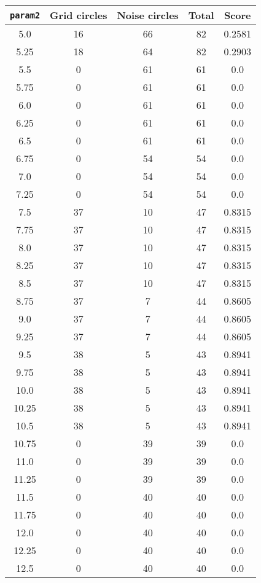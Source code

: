 \documentclass[letterpaper, 12pt]{article}
\begin{document}
\begin{longtable}{|c|c|c|c|c|}
\hline
\textbf{\texttt{param2}} & \textbf{Grid circles} & \textbf{Noise circles} & \textbf{Total} & \textbf{Score} \\
\hline
5.0 & 16 & 66 & 82 & 0.2581 \\
\hline
5.25 & 18 & 64 & 82 & 0.2903 \\
\hline
5.5 & 0 & 61 & 61 & 0.0 \\
\hline
5.75 & 0 & 61 & 61 & 0.0 \\
\hline
6.0 & 0 & 61 & 61 & 0.0 \\
\hline
6.25 & 0 & 61 & 61 & 0.0 \\
\hline
6.5 & 0 & 61 & 61 & 0.0 \\
\hline
6.75 & 0 & 54 & 54 & 0.0 \\
\hline
7.0 & 0 & 54 & 54 & 0.0 \\
\hline
7.25 & 0 & 54 & 54 & 0.0 \\
\hline
7.5 & 37 & 10 & 47 & 0.8315 \\
\hline
7.75 & 37 & 10 & 47 & 0.8315 \\
\hline
8.0 & 37 & 10 & 47 & 0.8315 \\
\hline
8.25 & 37 & 10 & 47 & 0.8315 \\
\hline
8.5 & 37 & 10 & 47 & 0.8315 \\
\hline
8.75 & 37 & 7 & 44 & 0.8605 \\
\hline
9.0 & 37 & 7 & 44 & 0.8605 \\
\hline
9.25 & 37 & 7 & 44 & 0.8605 \\
\hline
9.5 & 38 & 5 & 43 & 0.8941 \\
\hline
9.75 & 38 & 5 & 43 & 0.8941 \\
\hline
10.0 & 38 & 5 & 43 & 0.8941 \\
\hline
10.25 & 38 & 5 & 43 & 0.8941 \\
\hline
10.5 & 38 & 5 & 43 & 0.8941 \\
\hline
10.75 & 0 & 39 & 39 & 0.0 \\
\hline
11.0 & 0 & 39 & 39 & 0.0 \\
\hline
11.25 & 0 & 39 & 39 & 0.0 \\
\hline
11.5 & 0 & 40 & 40 & 0.0 \\
\hline
11.75 & 0 & 40 & 40 & 0.0 \\
\hline
12.0 & 0 & 40 & 40 & 0.0 \\
\hline
12.25 & 0 & 40 & 40 & 0.0 \\
\hline
12.5 & 0 & 40 & 40 & 0.0 \\

\end{longtable}
\end{document}
